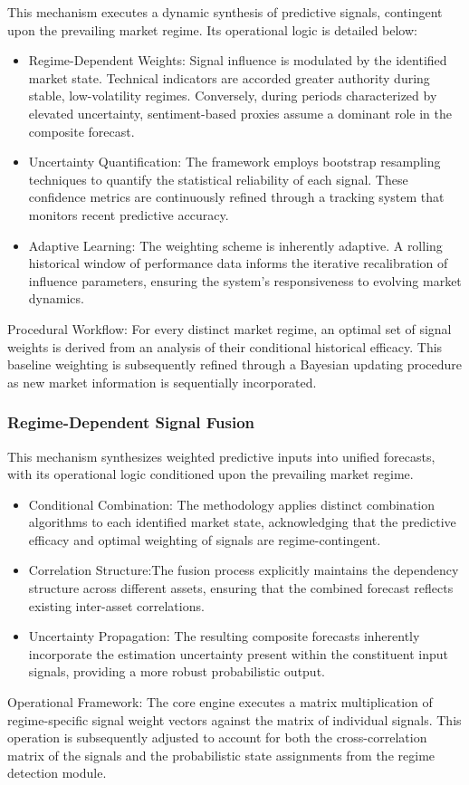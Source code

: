 \documentclass{singlecol-new}
\theoremstyle{TH}{
\newtheorem{lemma}{Lemma}
\newtheorem{theorem}[lemma]{Theorem}
\newtheorem{corrolary}[lemma]{Corrolary}
\newtheorem{conjecture}[lemma]{Conjecture}
\newtheorem{proposition}[lemma]{Proposition}
\newtheorem{claim}[lemma]{Claim}
\newtheorem{stheorem}[lemma]{Wrong Theorem}
\newtheorem{algorithm}{Algorithm}
}
\theoremstyle{THrm}{
\newtheorem{definition}{Definition}[section]
\newtheorem{question}{Question}[section]
\newtheorem{remark}{Remark}
\newtheorem{scheme}{Scheme}
}
\theoremstyle{THhit}{
\newtheorem{case}{Case}[section]
}
\begin{document}
This mechanism executes a dynamic synthesis of predictive signals, contingent upon the prevailing market regime. Its operational logic is detailed below:


\begin{itemize}
    \item Regime-Dependent Weights: Signal influence is modulated by the identified market state. Technical indicators are accorded greater authority during stable, low-volatility regimes. Conversely, during periods characterized by elevated uncertainty, sentiment-based proxies assume a dominant role in the composite forecast.
    \item Uncertainty Quantification: The framework employs bootstrap resampling techniques to quantify the statistical reliability of each signal. These confidence metrics are continuously refined through a tracking system that monitors recent predictive accuracy.
    \item Adaptive Learning: The weighting scheme is inherently adaptive. A rolling historical window of performance data informs the iterative recalibration of influence parameters, ensuring the system's responsiveness to evolving market dynamics.
\end{itemize}
Procedural Workflow: For every distinct market regime, an optimal set of signal weights is derived from an analysis of their conditional historical efficacy. This baseline weighting is subsequently refined through a Bayesian updating procedure as new market information is sequentially incorporated.

\subsubsection{Regime-Dependent Signal Fusion}

This mechanism synthesizes weighted predictive inputs into unified forecasts, with its operational logic conditioned upon the prevailing market regime.
\begin{itemize}
    \item Conditional Combination: The methodology applies distinct combination algorithms to each identified market state, acknowledging that the predictive efficacy and optimal weighting of signals are regime-contingent.
    \item Correlation Structure:The fusion process explicitly maintains the dependency structure across different assets, ensuring that the combined forecast reflects existing inter-asset correlations.
    \item Uncertainty Propagation: The resulting composite forecasts inherently incorporate the estimation uncertainty present within the constituent input signals, providing a more robust probabilistic output.
\end{itemize}
Operational Framework: The core engine executes a matrix multiplication of regime-specific signal weight vectors against the matrix of individual signals. This operation is subsequently adjusted to account for both the cross-correlation matrix of the signals and the probabilistic state assignments from the regime detection module.
\end{document}
